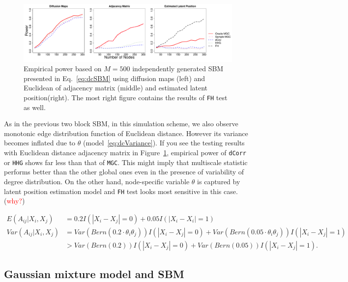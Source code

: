 \documentclass[12pt]{article}
\theoremstyle{definition}
\begin{document}
\begin{figure}[h]
	\centering
	\includegraphics[width=7in]{../Figure/dcSBM.pdf}
	\caption{Empirical power based on $M = 500$ independently generated SBM presented in Eq.~\ref{eq:dcSBM} using diffusion maps (left) and Euclidean of adjacency matrix (middle)  and estimated latent position(right). The most right figure contains the results of \texttt{FH} test as well.}
		\label{fig:dcSBM}
\end{figure}	

As in the previous two block SBM, in this simulation scheme, we also observe monotonic edge distribution function of Euclidean distance. However its variance becomes inflated due to $\theta$ (model~\ref{eq:dcVariance}). If you see the testing results with Euclidean distance adjacency matrix in Figure~\ref{fig:dcSBM}, empirical power of \texttt{dCorr} or \texttt{HHG} shows far less than that of \texttt{MGC}. This might imply that multiscale statistic performs better than the other global ones even in the presence of variability of degree distribution. On the other hand, node-specific variable $\theta$ is captured by latent position estimation model \citep{fosdick2015testing} and \texttt{FH} test looks most sensitive in this case. (\textcolor{red}{why?}) 
	
\begin{equation}
\begin{aligned}
E(A_{ij} | X_{i}, X_{j}) &  =  0.2 I(|X_{i} - X_{j}| = 0) + 0.05 I(|X_{i} - X_{i}| = 1) \\
Var(A_{ij} | X_{i}, X_{j}) & = Var( Bern(0.2 \cdot \theta_{i} \theta_{j})) I(|X_{i} - X_{j}| = 0) +
Var( Bern(0.05 \cdot \theta_{i} \theta_{j}) ) I( |X_{i} - X_{j}| = 1) \\
& > Var(Bern(0.2)) I(|X_{i} - X_{j}| = 0) + Var(Bern(0.05)) I(|X_{i} - X_{j}| = 1).
\end{aligned}
\label{eq:dcVariance}
\end{equation}	
	
	
\subsection{Gaussian mixture model and SBM}
\end{document}
